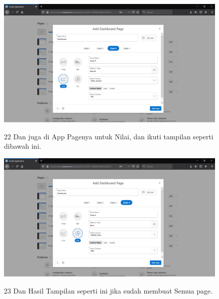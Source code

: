 \begin{enumerate}
\begin{figure}
    \begin{center}
\includegraphics[scale=0.2]{figures/35.png}
    \caption{\textit{}}
        \end{center}
\label{gambar}
\end{figure}


\begin{figure}
\item[22]Dan juga di App Pagenya untuk Nilai, dan ikuti tampilan seperti dibawah ini.

    \begin{center}
\includegraphics[scale=0.2]{figures/36.png}
    \caption{\textit{}}
        \end{center}
\label{gambar}
\end{figure}


\begin{figure}
\item[23]Dan Hasil Tampilan seperti ini jika sudah membuat Semua page.


\end{figure}
\end{enumerate}

